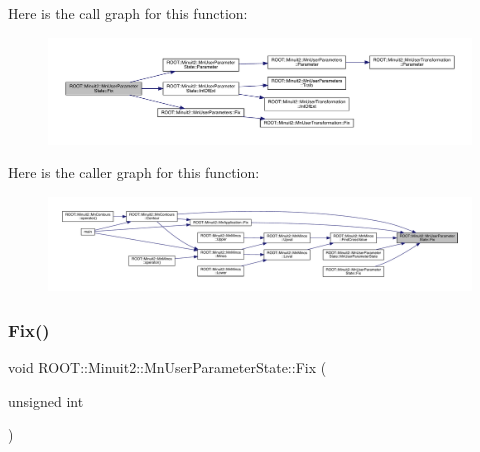Here is the call graph for this function\+:
\nopagebreak
\begin{figure}[H]
\begin{center}
\leavevmode
\includegraphics[width=350pt]{d3/de0/classROOT_1_1Minuit2_1_1MnUserParameterState_a89b898660495dd7fb95bb1c398941e17_cgraph}
\end{center}
\end{figure}
Here is the caller graph for this function\+:
\nopagebreak
\begin{figure}[H]
\begin{center}
\leavevmode
\includegraphics[width=350pt]{d3/de0/classROOT_1_1Minuit2_1_1MnUserParameterState_a89b898660495dd7fb95bb1c398941e17_icgraph}
\end{center}
\end{figure}
\mbox{\label{classROOT_1_1Minuit2_1_1MnUserParameterState_a89b898660495dd7fb95bb1c398941e17}} 
\subsubsection{\texorpdfstring{Fix()}{Fix()}\hspace{0.1cm}{\footnotesize\ttfamily [3/6]}}
{\footnotesize\ttfamily void R\+O\+O\+T\+::\+Minuit2\+::\+Mn\+User\+Parameter\+State\+::\+Fix (\begin{DoxyParamCaption}\item[{unsigned int}]{ }\end{DoxyParamCaption})}

\mbox{\label{classROOT_1_1Minuit2_1_1MnUserParameterState_a9d24e3eed7080907f4368e87e8770dcd}} 
